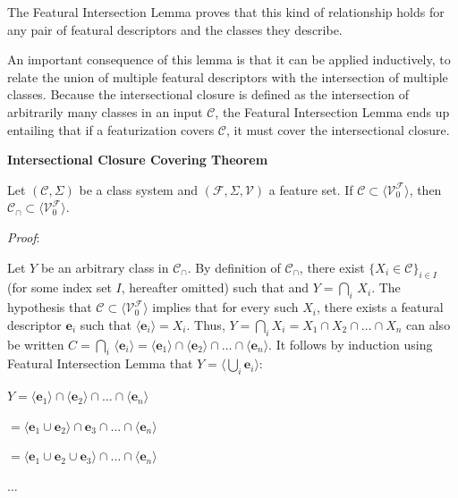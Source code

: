 \documentclass[11pt, oneside]{article}   	%
\begin{document}
\noindent The Featural Intersection Lemma proves that this kind of relationship holds for any pair of featural descriptors and the classes they describe.

An important consequence of this lemma is that it can be applied inductively, to relate the union of multiple featural descriptors with the intersection of multiple classes. Because the intersectional closure is defined as the intersection of arbitrarily many classes in an input $\mathcal C$, the Featural Intersection Lemma ends up entailing that if a featurization covers $\mathcal C$, it must cover the intersectional closure.

\vspace{\baselineskip} \noindent \textbf{Intersectional Closure Covering Theorem}

Let $(\mathcal C, \Sigma)$ be a class system and $(\mathcal F, \Sigma, \mathcal V)$ a feature set. If $\mathcal C \subset \langle \mathcal V_0^\mathcal F \rangle$, then $\mathcal C_\cap \subset\langle \mathcal V_0^\mathcal F \rangle $.

\vspace{\baselineskip} \noindent \textit{Proof}:

Let $Y$ be an arbitrary class in $\mathcal C_\cap$. By definition of $\mathcal C_\cap$, there exist $\{X_i \in \mathcal C\}_{i \in I}$ (for some index set $I$, hereafter omitted) such that and $Y = \bigcap_i \, X_i$. The hypothesis that $\mathcal C \subset \langle \mathcal V_0^\mathcal F \rangle $ implies that for every such $X_i$, there exists a featural descriptor $\mathbf{e}_i$ such that $\langle \mathbf{e}_i \rangle = X_i$. Thus, $Y = \bigcap_i X_i = X_1 \cap X_2 \cap \ldots \cap X_n$ can also be written $C = \bigcap_i \, \langle \mathbf{e}_i \rangle = \langle \mathbf{e}_1 \rangle \cap \langle \mathbf{e}_2 \rangle \cap \ldots \cap \langle \mathbf{e}_n \rangle$. It follows by induction using Featural Intersection Lemma that $Y = \langle \bigcup_i \mathbf{e}_i \rangle$:

$Y = \langle \mathbf{e}_1 \rangle \cap  \langle \mathbf{e}_2 \rangle \cap \ldots \cap  \langle \mathbf{e}_n \rangle$

\quad $ = \langle \mathbf{e}_1 \cup \mathbf{e}_2 \rangle \cap \mathbf{e}_3 \cap \ldots \cap \langle \mathbf{e}_n \rangle$

\quad $ = \langle \mathbf{e}_1 \cup \mathbf{e}_2 \cup \mathbf{e}_3 \rangle \cap \ldots \cap \langle \mathbf{e}_n \rangle$

\quad $\ldots$
\end{document}
